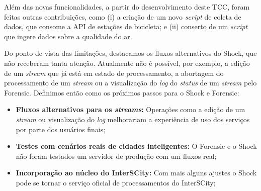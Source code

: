 Além das novas funcionalidades, a partir do desenvolvimento deste TCC, foram
feitas outras contribuições, como (i) a criação de um novo \textit{script} de
coleta de dados, que consome a API de estações de bicicleta; e (ii) conserto
de um \textit{script} que ingere dados sobre a qualidade do ar.

Do ponto de vista das limitações, destacamos os fluxos alternativos do Shock,
que não receberam tanta atenção. Atualmente não é possível, por exemplo, a
edição de um \textit{stream} que já está em estado de processamento, a
abortagem do processamento de um \textit{stream} ou a visualização do
\textit{log} do \textit{status} de um \textit{stream} pelo Forensic. Definimos
então como os próximos passos para o Shock e Forensic:

\begin{itemize}
    \item \textbf{Fluxos alternativos para os \textit{streams}:} Operações como
        a edição de um \textit{stream} ou visualização do \textit{log}
        melhorariam a experiência de uso dos serviços por parte dos usuários
        finais;
    \item \textbf{Testes com cenários reais de cidades inteligentes:} O
        Forensic e o Shock não foram testados um servidor de produção com um
        fluxos real;
    \item \textbf{Incorporação ao núcleo do InterSCity:} Com mais alguns
        ajustes o Shock pode se tornar o serviço oficial de processamentos do
        InterSCity;
\end{itemize}
